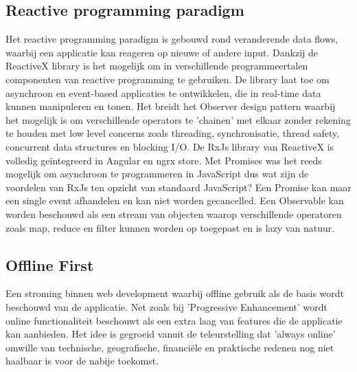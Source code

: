 \subsection{Reactive programming paradigm}
Het reactive programming paradigm is gebouwd rond veranderende data flows, waarbij een applicatie kan reageren op nieuwe of andere input. Dankzij de ReactiveX library is het mogelijk om in verschillende programmeertalen componenten van reactive programming te gebruiken. De library laat toe om asynchroon en event-based applicaties te ontwikkelen, die in real-time data kunnen manipuleren en tonen. Het breidt het Observer design pattern waarbij het mogelijk is om verschillende operators te 'chainen' met elkaar zonder rekening te houden met low level concerns zoals threading, synchronisatie, thread safety, concurrent data structures en blocking I/O. De RxJs library van ReactiveX is volledig ge\"integreerd in Angular en ngrx store. Met Promises was het reeds mogelijk om asynchroon te programmeren in JavaScript dus wat zijn de voordelen van RxJs ten opzicht van standaard JavaScript? Een Promise kan maar een single event afhandelen en kan niet worden gecancelled. Een Observable kan worden beschouwd als een stream van objecten waarop verschillende operatoren zoals map, reduce en filter kunnen worden op toegepast en is lazy van natuur.
\subsection{Offline First}
Een stroming binnen web development waarbij offline gebruik als de basis wordt beschouwd van de applicatie. Net zoals bij 'Progressive Enhancement' wordt online functionaliteit beschouwt als een extra laag van features die de applicatie kan aanbieden. Het idee is gegroeid vanuit de teleurstelling dat 'always online' omwille van technische, geografische, financi\"ele en praktische redenen nog niet haalbaar is voor de nabije toekomst.

